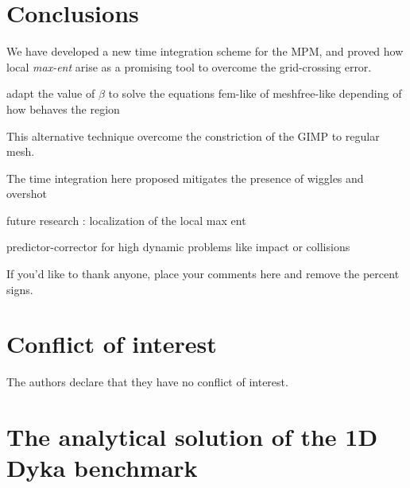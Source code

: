

\section{Conclusions}
\label{sec:conclusions}
We have developed a new time integration scheme for the MPM, and
proved how local \textit{max-ent} arise as a promising tool to
overcome the grid-crossing error.

adapt the value of $\beta$ to solve the equations fem-like of
meshfree-like depending of how behaves the region

This alternative technique overcome the constriction of the GIMP to
regular mesh.

The time integration here proposed mitigates the presence of wiggles
and overshot

future research :
localization of the local max ent

predictor-corrector for high dynamic problems like impact or
collisions 

\begin{acknowledgements}
If you'd like to thank anyone, place your comments here
and remove the percent signs.
\end{acknowledgements}

%
\section*{Conflict of interest}
%
The authors declare that they have no conflict of interest.


\appendix
\section{The analytical solution of the 1D Dyka benchmark}
\label{app:analytical_sol}


